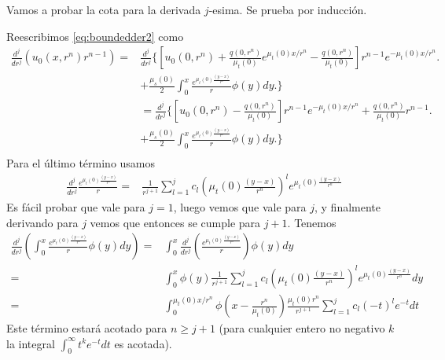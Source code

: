Vamos a probar la cota para la derivada $j$-esima. Se prueba por inducción. 

Reescribimos \eqref{eq:boundedder2} como
\begin{equation}
\begin{split}
\frac{d^j }{dr^j} \left( u_0(x,r^n) r^{n-1} \right)=&\frac{d^j }{dr^j} \Bigg\{ 
\left[u_0(0,r^n) + \frac{q(0,r^n)}{\mu_t(0)}e^{\mu_t(0)x/r^n}-\frac{q(0,r^n)}{\mu_t(0)} \right]r^{n-1}e^{-\mu_t(0)x/r^n}   \Bigg.\\
&+ \frac{\mu_s(0)}{2} \int_0^{x} \frac{e^{\mu_t(0)\frac{(y-x)}{r^n}}}{r} \phi(y) dy \Bigg. \Bigg\}\\
&=\frac{d^j }{dr^j} \Bigg\{ 
\left[u_0(0,r^n) -\frac{q(0,r^n)}{\mu_t(0)} \right]r^{n-1}e^{-\mu_t(0)x/r^n} + \frac{q(0,r^n)}{\mu_t(0)}r^{n-1}   \Bigg.\\
&+ \frac{\mu_s(0)}{2} \int_0^{x} \frac{e^{\mu_t(0)\frac{(y-x)}{r^n}}}{r} \phi(y) dy \Bigg. \Bigg\}\\
\end{split}
\label{eq:boundedder3}
\end{equation}
Para el último término usamos
\begin{equation}
\begin{split}
\frac{d^j }{dr^j} \frac{e^{\mu_t(0)\frac{(y-x)}{r^n}}}{r}=&  \frac{1}{r^{j+1}}\sum_{l=1}^j c_l \left( \mu_t(0)\frac{(y-x)}{r^n} \right)^l e^{\mu_t(0)\frac{(y-x)}{r^n}}
\end{split}
\label{eq:derivadasj}
\end{equation}
Es fácil probar que vale para $j=1$, luego vemos que vale para $j$, 
y finalmente derivando para $j$ vemos que entonces se cumple para $j+1$.
Tenemos
\begin{equation}
\begin{split}
\frac{d^j }{dr^j}\left( \int_0^{x} \frac{e^{\mu_t(0)\frac{(y-x)}{r^n}}}{r} \phi(y) dy \right) =& \int_0^{x} \frac{d^j }{dr^j}\left(  \frac{e^{\mu_t(0)\frac{(y-x)}{r^n}}}{r} \right) \phi(y) dy\\
=&\int_0^{x} \phi(y)  \frac{1}{r^{j+1}}\sum_{l=1}^j c_l \left( \mu_t(0)\frac{(y-x)}{r^n} \right)^l e^{\mu_t(0)\frac{(y-x)}{r^n}}dy\\
=&\int_0^{\mu_t(0)x/r^n} \phi\left(x-\frac{r^n}{\mu_t(0)}\right)  \frac{\mu_t(0) r^n}{r^{j+1}}\sum_{l=1}^j c_l \left( -t \right)^l e^{-t}dt
\end{split}
\label{eq:derivadasj2}
\end{equation}
Este término estará acotado para $n\ge j+1$ (para cualquier entero no negativo $k$ 
la integral $\int_0^\infty t^k e^{-t} dt$ es acotada).

